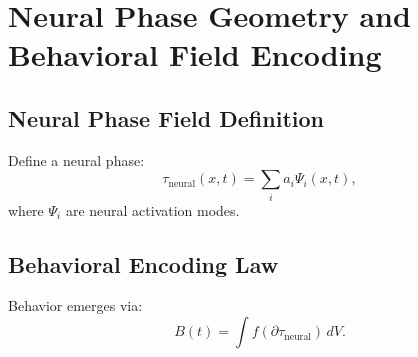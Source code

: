 \chapter{Neural Phase Geometry and Behavioral Field Encoding}

\section{Neural Phase Field Definition}
Define a neural phase:
\[
\tau_{\mathrm{neural}}(x,t) = \sum_i a_i \Psi_i(x,t),
\]
where \(\Psi_i\) are neural activation modes.

\section{Behavioral Encoding Law}
Behavior emerges via:
\[
B(t) = \int f(\partial\tau_{\mathrm{neural}})\, dV.
\]

